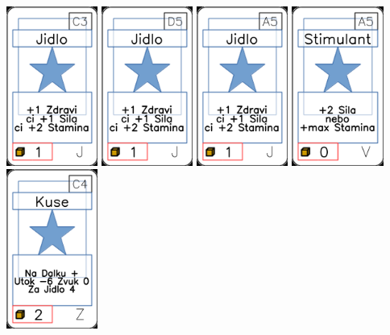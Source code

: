 \documentclass[a4paper]{article}
\begin{document}
	\includegraphics[width=3.0cm]{img-1_12}
	\includegraphics[width=3.0cm]{img-1_19}
	\includegraphics[width=3.0cm]{img-1_4}
	\includegraphics[width=3.0cm]{img-1_64}
	\includegraphics[width=3.0cm]{img-1_103}
\end{document}
